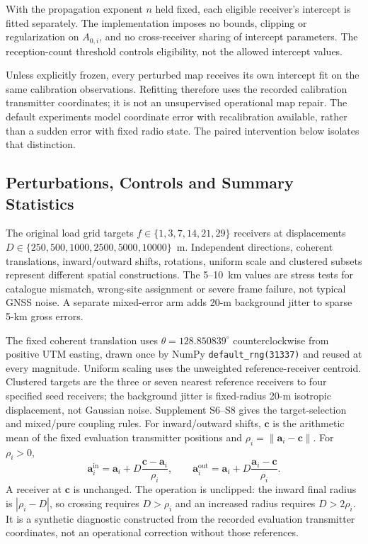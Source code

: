 \documentclass[11pt,a4paper]{article}
\begin{document}
With the propagation exponent $n$ held fixed, each eligible receiver's intercept is fitted separately. The implementation imposes no bounds, clipping or regularization on $A_{0,i}$, and no cross-receiver sharing of intercept parameters. The reception-count threshold controls eligibility, not the allowed intercept values.

Unless explicitly frozen, every perturbed map receives its own intercept fit on the same calibration observations. Refitting therefore uses the recorded calibration transmitter coordinates; it is not an unsupervised operational map repair. The default experiments model coordinate error with recalibration available, rather than a sudden error with fixed radio state. The paired intervention below isolates that distinction.

\subsection{Perturbations, Controls and Summary Statistics}\label{sec:design}
The original load grid targets $f\in\{1,3,7,14,21,29\}$ receivers at displacements $D\in\{250,500,1000,2500,5000,10000\}$~m. Independent directions, coherent translations, inward/outward shifts, rotations, uniform scale and clustered subsets represent different spatial constructions. The 5--10~km values are stress tests for catalogue mismatch, wrong-site assignment or severe frame failure, not typical GNSS noise. A separate mixed-error arm adds 20-m background jitter to sparse 5-km gross errors.

The fixed coherent translation uses $\theta=128.850839^\circ$ counterclockwise from positive UTM easting, drawn once by NumPy \texttt{default\_rng(31337)} and reused at every magnitude. Uniform scaling uses the unweighted reference-receiver centroid. Clustered targets are the three or seven nearest reference receivers to four specified seed receivers; the background jitter is fixed-radius 20-m isotropic displacement, not Gaussian noise. Supplement S6--S8 gives the target-selection and mixed/pure coupling rules.
For inward/outward shifts, $\mathbf c$ is the arithmetic mean of the fixed evaluation transmitter positions and $\rho_i=\|\mathbf a_i-\mathbf c\|$. For $\rho_i>0$,
\begin{equation}
 \mathbf a_i^{\mathrm{in}}=\mathbf a_i+D\frac{\mathbf c-\mathbf a_i}{\rho_i},\qquad
 \mathbf a_i^{\mathrm{out}}=\mathbf a_i+D\frac{\mathbf a_i-\mathbf c}{\rho_i}.
\label{eq:radial}
\end{equation}
A receiver at $\mathbf c$ is unchanged. The operation is unclipped: the inward final radius is $|\rho_i-D|$, so crossing requires $D>\rho_i$ and an increased radius requires $D>2\rho_i$. It is a synthetic diagnostic constructed from the recorded evaluation transmitter coordinates, not an operational correction without those references.
\end{document}
